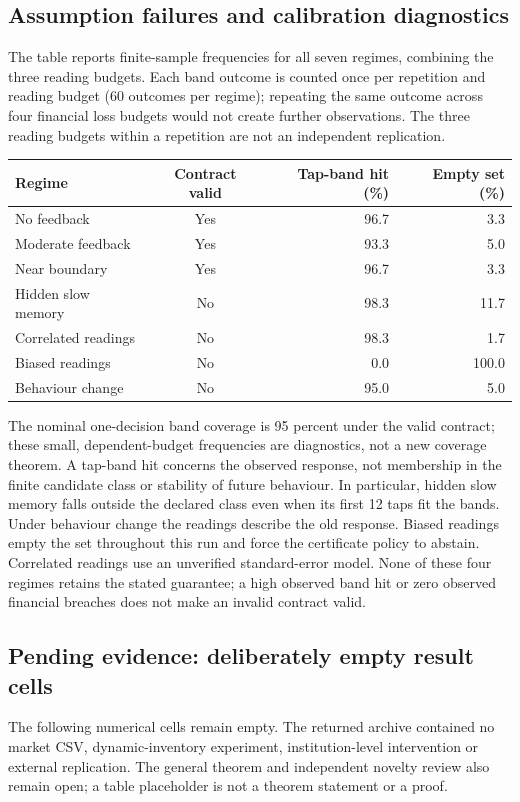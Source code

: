 \documentclass[12pt]{article}
\theoremstyle{definition}
\theoremstyle{remark}
\begin{document}
\subsection*{Assumption failures and calibration diagnostics}
The table reports finite-sample frequencies for all seven regimes, combining
the three reading budgets. Each band outcome is counted once per repetition
and reading budget (60 outcomes per regime); repeating the same outcome across
four financial loss budgets would not create further observations. The three
reading budgets within a repetition are not an independent replication.
\begin{center}\small
\begin{tabular}{lcrr}
\toprule
Regime & Contract valid & Tap-band hit (\%) & Empty set (\%)\\
\midrule
No feedback & Yes & 96.7 & 3.3\\
Moderate feedback & Yes & 93.3 & 5.0\\
Near boundary & Yes & 96.7 & 3.3\\
Hidden slow memory & No & 98.3 & 11.7\\
Correlated readings & No & 98.3 & 1.7\\
Biased readings & No & 0.0 & 100.0\\
Behaviour change & No & 95.0 & 5.0\\
\bottomrule
\end{tabular}
\end{center}
The nominal one-decision band coverage is 95 percent under the valid contract;
these small, dependent-budget frequencies are diagnostics, not a new coverage
theorem. A tap-band hit concerns the observed response, not membership in the
finite candidate class or stability of future behaviour. In particular, hidden
slow memory falls outside the declared class even when its first 12 taps fit
the bands. Under behaviour change the readings describe the old response.
Biased readings empty the set throughout this run and force the certificate
policy to abstain. Correlated readings use an unverified standard-error model.
None of these four regimes retains the stated guarantee; a high observed band
hit or zero observed financial breaches does not make an invalid contract valid.

\subsection*{Pending evidence: deliberately empty result cells}
The following numerical cells remain empty. The returned archive contained no
market CSV, dynamic-inventory experiment, institution-level intervention or
external replication. The general theorem and independent novelty review also
remain open; a table placeholder is not a theorem statement or a proof.
\end{document}

